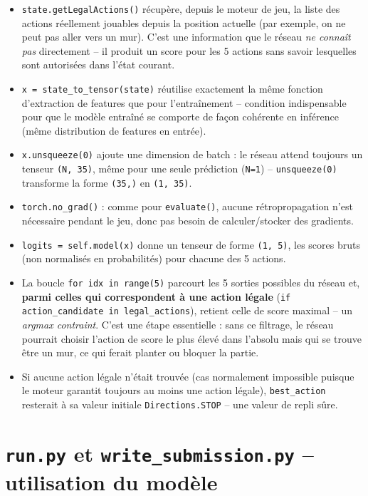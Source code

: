 \documentclass[a4paper,12pt]{article}
\begin{document}
\begin{itemize}
    \item \texttt{state.getLegalActions()} récupère, depuis le moteur de
    jeu, la liste des actions réellement jouables depuis la position
    actuelle (par exemple, on ne peut pas aller vers un mur). C'est une
    information que le réseau \emph{ne connaît pas} directement -- il
    produit un score pour les 5 actions sans savoir lesquelles sont
    autorisées dans l'état courant.
    \item \texttt{x = state\_to\_tensor(state)} réutilise exactement la
    même fonction d'extraction de features que pour l'entraînement --
    condition indispensable pour que le modèle entraîné se comporte de
    façon cohérente en inférence (même distribution de features en
    entrée).
    \item \texttt{x.unsqueeze(0)} ajoute une dimension de batch : le
    réseau attend toujours un tenseur \texttt{(N, 35)}, même pour une
    seule prédiction (\texttt{N=1}) -- \texttt{unsqueeze(0)} transforme
    la forme \texttt{(35,)} en \texttt{(1, 35)}.
    \item \texttt{torch.no\_grad()} : comme pour \texttt{evaluate()},
    aucune rétropropagation n'est nécessaire pendant le jeu, donc pas
    besoin de calculer/stocker des gradients.
    \item \texttt{logits = self.model(x)} donne un tenseur de forme
    \texttt{(1, 5)}, les scores bruts (non normalisés en probabilités)
    pour chacune des 5 actions.
    \item La boucle \texttt{for idx in range(5)} parcourt les 5 sorties
    possibles du réseau et, \textbf{parmi celles qui correspondent à une
    action légale} (\texttt{if action\_candidate in legal\_actions}),
    retient celle de score maximal -- un \emph{argmax contraint}. C'est
    une étape essentielle : sans ce filtrage, le réseau pourrait choisir
    l'action de score le plus élevé dans l'absolu mais qui se trouve être
    un mur, ce qui ferait planter ou bloquer la partie.
    \item Si aucune action légale n'était trouvée (cas normalement
    impossible puisque le moteur garantit toujours au moins une action
    légale), \texttt{best\_action} resterait à sa valeur initiale
    \texttt{Directions.STOP} -- une valeur de repli sûre.
\end{itemize}

\newpage
\section{\texttt{run.py} et \texttt{write\_submission.py} -- utilisation du modèle}
\end{document}
